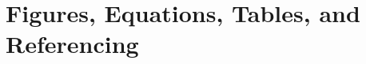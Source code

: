 

\chapter[Figures, Equations, Tables, and Referencing]{Figures, Equations, Tables, and Referencing}
\label{ch1}


\lipsum[1]






